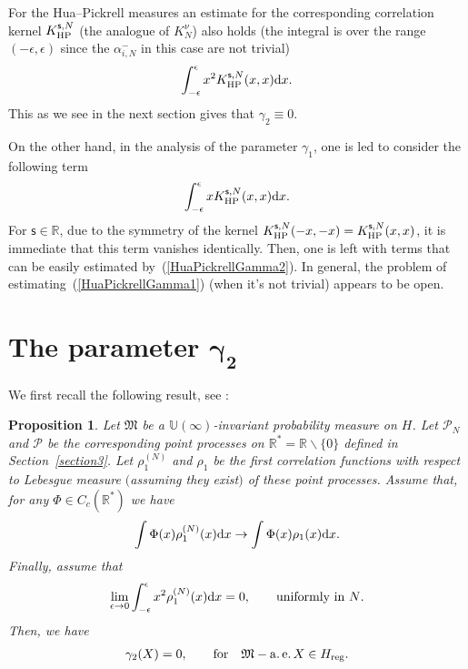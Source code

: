 \documentclass[pdftex]{sigma}
\numberwithin{equation}{section}
\newtheorem{Proposition}[Theorem]{Proposition}
{ \theoremstyle{definition}
\newtheorem{Definition}[Theorem]{Definition}
\newtheorem{Remark}[Theorem]{Remark} }
\begin{document}
\begin{Remark}\label{EstimatesHuaPickrell}
For the Hua--Pickrell measures an estimate for the corresponding correlation kernel $K_{\rm HP}^{\mathsf{s},N}$ (the analogue of $K_{N}^{\nu}$) also holds (the integral is over the range $(-\epsilon,\epsilon)$ since the $\alpha_{i,N}^-$ in this case are not trivial)
\begin{gather}\label{HuaPickrellGamma2}
\int_{-\epsilon}^{\epsilon}x^2K_{\rm HP}^{\mathsf{s},N}(x,x){\rm d}x.
\end{gather}
This as we see in the next section gives that $\gamma_2 \equiv 0$.

On the other hand, in the analysis of the parameter $\gamma_1$, one is led to consider the following term
\begin{gather}\label{HuaPickrellGamma1}
\int_{-\epsilon}^{\epsilon}xK_{\rm HP}^{\mathsf{s},N}(x,x){\rm d}x.
\end{gather}
For $\mathsf{s} \in \mathbb{R}$, due to the symmetry of the kernel $K_{\rm HP}^{\mathsf{s},N}(-x,-x)=K_{\rm HP}^{\mathsf{s},N}(x,x)$, it is immediate that this term vanishes identically. Then, one is left with terms that can be easily estimated by~(\ref{HuaPickrellGamma2}). In general, the problem of estimating~(\ref{HuaPickrellGamma1}) (when it's not trivial) appears to be open.
\end{Remark}

\section[The parameter $\gamma_2$]{The parameter $\boldsymbol{\gamma_2}$}\label{section6}

We first recall the following result, see \cite[Proposition~7.2]{BorodinOlshanskiErgodic}:

\begin{Proposition}\label{BorodinOlshanskiGamm2}
Let $\mathfrak{M}$ be a $\mathbb{U}(\infty)$-invariant probability measure on $H$. Let $\mathcal{P}_N$ and $\mathcal{P}$ be the corresponding point processes on $\mathbb{R}^*=\mathbb{R}\backslash\{0\}$ defined in Section~{\rm \ref{section3}}. Let $\rho_1^{(N)}$ and $\rho_1$ be the first correlation functions with respect to Lebesgue measure $($assuming they exist$)$ of these point processes. Assume that, for any $\Phi\in C_c (\mathbb{R}^*)$ we have
\begin{gather}\label{ConvergenceCorrelationGamma2}
\int \Phi(x)\rho_1^{(N)}(x){\rm d}x\to \int \Phi(x)\rho_1(x){\rm d}x.
\end{gather}
Finally, assume that
\begin{gather}\label{UniformEstimateGamma2}
\lim_{\epsilon \to 0} \int_{-\epsilon}^{\epsilon}x^2 \rho_1^{(N)}(x){\rm d}x=0, \qquad \text{uniformly in $N$}.
\end{gather}
Then, we have
\begin{gather*}
\gamma_2(X)=0, \qquad \text{for} \quad \mathfrak{M}-\operatorname{a.e.} X \in H_{{\rm reg}}.
\end{gather*}
\end{Proposition}
\end{document}

